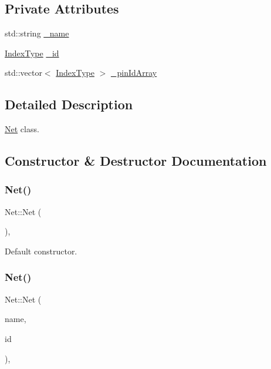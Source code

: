 \subsection*{Private Attributes}
\begin{DoxyCompactItemize}
\item 
std\+::string \hyperlink{classNet_a29e9f56c4c3827fdf1ee8625216afdd5}{\+\_\+name}
\item 
\hyperlink{type_8h_a581e8093e28e7362f2b6937296190676}{Index\+Type} \hyperlink{classNet_a510f27db002268fc15a1151cc9951c04}{\+\_\+id}
\item 
std\+::vector$<$ \hyperlink{type_8h_a581e8093e28e7362f2b6937296190676}{Index\+Type} $>$ \hyperlink{classNet_a0cf0ec3b779c2e24af461231d324c998}{\+\_\+pin\+Id\+Array}
\end{DoxyCompactItemize}


\subsection{Detailed Description}
\hyperlink{classNet}{Net} class. 

\subsection{Constructor \& Destructor Documentation}
\mbox{\label{classNet_ad2d03f95c5cb74fb3ebcb79738e5a76c}} 
\subsubsection{\texorpdfstring{Net()}{Net()}\hspace{0.1cm}{\footnotesize\ttfamily [1/2]}}
{\footnotesize\ttfamily Net\+::\+Net (\begin{DoxyParamCaption}{ }\end{DoxyParamCaption})\hspace{0.3cm}{\ttfamily [explicit]}, {\ttfamily [default]}}

Default constructor. \mbox{\label{classNet_ae7ae2cad153da40e1c70062ef2903358}} 
\subsubsection{\texorpdfstring{Net()}{Net()}\hspace{0.1cm}{\footnotesize\ttfamily [2/2]}}
{\footnotesize\ttfamily Net\+::\+Net (\begin{DoxyParamCaption}\item[{const std\+::string \&}]{name,  }\item[{\hyperlink{type_8h_a581e8093e28e7362f2b6937296190676}{Index\+Type}}]{id }\end{DoxyParamCaption})\hspace{0.3cm}{\ttfamily [inline]}, {\ttfamily [explicit]}}



